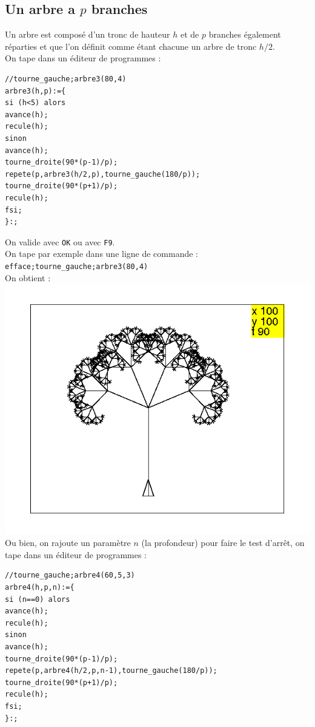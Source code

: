 \documentclass[a4paper,11pt]{book}
\begin{document}
\subsection{Un arbre a $p$ branches}
Un arbre est compos\'e d'un tronc de hauteur $h$ et de $p$ branches 
\'egalement r\'eparties et que l'on d\'efinit comme 
\'etant chacune un arbre de tronc $h/2$.\\
On tape dans un \'editeur de programmes :
\begin{verbatim}
//tourne_gauche;arbre3(80,4)
arbre3(h,p):={
si (h<5) alors
avance(h);
recule(h);
sinon
avance(h);
tourne_droite(90*(p-1)/p);
repete(p,arbre3(h/2,p),tourne_gauche(180/p));
tourne_droite(90*(p+1)/p);
recule(h);
fsi;
}:;
\end{verbatim}
On valide avec {\tt OK} ou avec {\tt F9}.\\
On tape par exemple dans une ligne de commande :\\
{\tt efface;tourne\_gauche;arbre3(80,4)}\\
On obtient :\\
\includegraphics[width=\textwidth]{tortarb3}\\
Ou bien, on rajoute un param\`etre $n$ (la profondeur) pour faire le test 
d'arr\^et, on tape dans un \'editeur de programmes :
\begin{verbatim}
//tourne_gauche;arbre4(60,5,3)
arbre4(h,p,n):={
si (n==0) alors
avance(h);
recule(h);
sinon
avance(h);
tourne_droite(90*(p-1)/p);
repete(p,arbre4(h/2,p,n-1),tourne_gauche(180/p));
tourne_droite(90*(p+1)/p);
recule(h);
fsi;
}:;
\end{verbatim}
\end{document}
